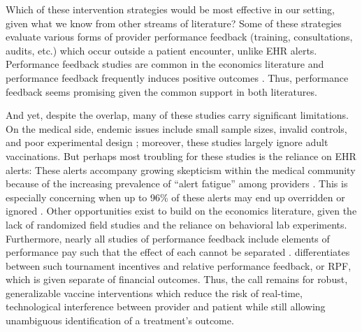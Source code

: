  Which of these intervention strategies would be most effective in our setting, given what we know from other streams of literature? Some of these strategies evaluate various forms of provider performance feedback (training, consultations, audits, etc.) which occur outside a patient encounter, unlike EHR alerts. Performance feedback studies are common in the economics literature \citep[see reviews in][]{Dechenaux2015,Schnieder2019} and performance feedback frequently induces positive outcomes \citep{Casas-Arce2009,Azmat2010,Blanes-i-Vidal2011,Delfgaauw2013,Song2018a}. Thus, performance feedback seems promising given the common support in both literatures.
	
 And yet, despite the overlap, many of these studies carry significant limitations. On the medical side, endemic issues include small sample sizes, invalid controls, and poor experimental design \citep[p. 1585 in][]{Smulian2016}; moreover, these studies largely ignore adult vaccinations. But perhaps most troubling for these studies is the reliance on EHR alerts: These alerts accompany growing skepticism within the medical community because of the increasing prevalence of “alert fatigue” among providers \citep{Peterson2001}. This is especially concerning when up to 96\% of these alerts may end up overridden or ignored \citep{VanDerSijs2006}. Other opportunities exist to build on the economics literature, given the lack of randomized field studies and the reliance on behavioral lab experiments. Furthermore, nearly all studies of performance feedback include elements of performance pay such that the effect of each cannot be separated \citep[e.g.,][]{Delfgaauw2014}. \cite{Schnieder2019} differentiates between such tournament incentives and relative performance feedback, or RPF, which is given separate of financial outcomes. Thus, the call remains for robust, generalizable vaccine interventions which reduce the risk of real-time, technological interference between provider and patient while still allowing unambiguous identification of a treatment’s outcome.
	
